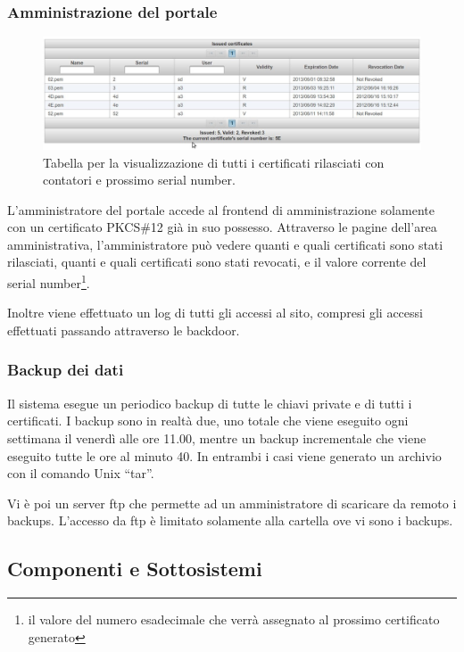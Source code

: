 \documentclass{article}
\begin{document}
\subsubsection*{Amministrazione del portale}
\begin{figure}[h!]
\centering
\includegraphics[width=\textwidth]{img/certs}
\caption{Tabella per la visualizzazione di tutti i certificati rilasciati con contatori e prossimo serial number.}
\end{figure}
L'amministratore del portale accede al frontend di amministrazione solamente con un certificato PKCS\#12 già in suo possesso. Attraverso le pagine dell'area amministrativa,  l'amministratore può vedere quanti e quali certificati sono stati rilasciati, quanti e quali certificati sono stati revocati, e il valore corrente del serial number\footnote{il valore del numero esadecimale che verrà assegnato al prossimo certificato generato}.
\par Inoltre viene effettuato un log di tutti gli accessi al sito, compresi gli accessi effettuati passando attraverso le backdoor.
\subsubsection*{Backup dei dati}
Il sistema esegue un periodico backup di tutte le chiavi private e di tutti i certificati. I backup sono in realtà due, uno totale che viene eseguito ogni settimana il venerdì alle ore 11.00, mentre un backup incrementale che viene eseguito tutte le ore al minuto 40. In entrambi i casi viene generato un archivio con il comando Unix ``tar''.
\par Vi è poi un server ftp che permette ad un amministratore di scaricare da remoto i backups. L'accesso da ftp è limitato solamente alla cartella ove vi sono i backups.

\subsection{Componenti e Sottosistemi}
\end{document}
